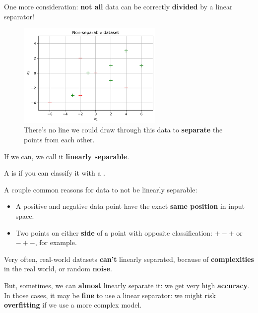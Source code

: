         One more consideration: \textbf{not all} data can be correctly \textbf{divided} by a linear separator!
        
        \begin{figure}[H]
            \centering
            
            \includegraphics[width=70mm,scale=0.5]{images/classification_images/non_separable_dataset.png}
            \caption*{There's no line we could draw through this data to \textbf{separate} the points from each other.}
        \end{figure}
            
        If we can, we call it \textbf{linearly separable}.\\
        
        \begin{definition}
            A  is  if you can  classify it with a .
        \end{definition}
        
        A couple common reasons for data to not be linearly separable:
        
        \begin{itemize}
            \item A positive and negative data point have the exact\textbf{ same position} in input space.
            
            \item Two points on either \textbf{side} of a point with opposite classification: $+-+$ or $-+-$, for example.
        \end{itemize}
        
        Very often, real-world datasets \textbf{can't} linearly separated, because of \textbf{complexities} in the real world, or random \textbf{noise}.
        
        But, sometimes, we can \textbf{almost} linearly separate it: we get very high \textbf{accuracy}. In those cases, it may be \textbf{fine} to use a linear separator: we might risk \textbf{overfitting} if we use a more complex model.
        
